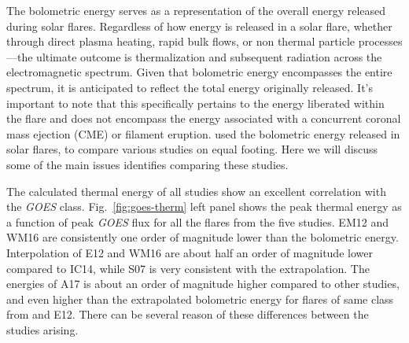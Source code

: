 \begin{table}[ht!]
    \centering
    \caption{The details of the studies.}
    \label{tab1}
\end{table}

The bolometric energy serves as a representation of the overall energy released during solar flares. Regardless of how energy is released in a solar flare, whether through direct plasma heating, rapid bulk flows, or non thermal particle processes—the ultimate outcome is thermalization and subsequent radiation across the electromagnetic spectrum. Given that bolometric energy encompasses the entire spectrum, it is anticipated to reflect the total energy originally released. It's important to note that this specifically pertains to the energy liberated within the flare and does not encompass the energy associated with a concurrent coronal mass ejection (CME) or filament eruption. \cite{warmuth20} used the bolometric energy released in solar flares, to compare various studies on equal footing. Here we will discuss some of the main issues \cite{warmuth20} identifies comparing these studies.

The calculated thermal energy of all studies show an excellent correlation with the {\it GOES} class. Fig.~\ref{fig:goes-therm} left panel shows the peak thermal energy as a function of peak {\it GOES} flux for all the flares from the five studies. EM12 and WM16 are consistently one order of magnitude lower than the bolometric energy. Interpolation of E12 and WM16 are about half an order of magnitude lower compared to IC14, while S07 is very consistent with the extrapolation. The energies of A17 is about an order of magnitude higher compared to other studies, and even higher than the extrapolated bolometric energy for flares of same class from \cite{kretzschmar11} and E12. There can be several reason of these differences between the studies arising.

